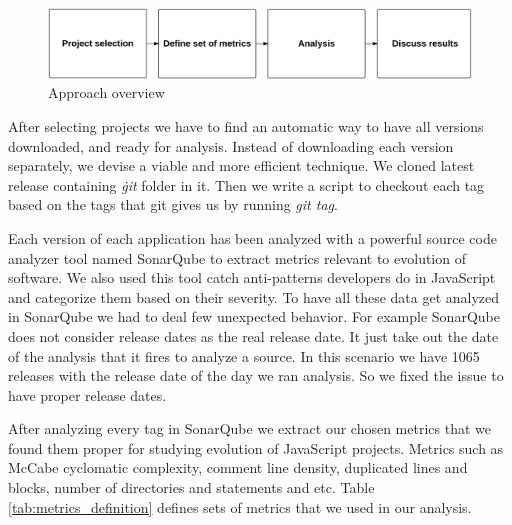  \begin{figure}[thb!]
 	\caption{Approach overview}
 	\centering
 	\label{fig:approach_overview}
 	\includegraphics[width=1\textwidth]{figures/approach_overview}
 \end{figure}
After selecting projects we have to find an automatic way to have all versions downloaded, and ready for analysis. Instead of downloading each version separately, we devise a viable and more efficient technique. We cloned latest release containing \textit{\.git} folder in it. Then we write a script to checkout each tag based on the tags that git gives us by running \textit{git tag}.
\par
Each version of each application has been analyzed with a powerful source code analyzer tool named SonarQube to extract metrics relevant to evolution of software. We also used this tool catch anti-patterns developers do in JavaScript and categorize them based on their severity.
To have all these data get analyzed in SonarQube we had to deal few unexpected behavior. For example SonarQube does not consider release dates as the real release date. It just take out the date of the analysis that it fires to analyze a source. In this scenario we have 1065 releases with the release date of the day we ran analysis. So we fixed the issue to have proper release dates.

\par After analyzing every tag in SonarQube we extract our chosen metrics that we found them proper for studying evolution of JavaScript projects. Metrics such as McCabe cyclomatic complexity,  comment line density, duplicated lines and blocks, number of directories and statements and etc. Table  \ref{tab:metrics_definition} defines sets of metrics that we used in our analysis.


